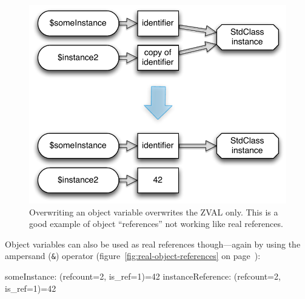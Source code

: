 \begin{figure}[htb]
  \begin{center}
    \includegraphics[scale=0.8]{images/someInstance_instance2}
    \caption{Overwriting an object variable overwrites the ZVAL only. This is a good example of object ``references'' not working like real references.}
    \label{fig:false-object-references}
  \end{center}
\end{figure}

Object variables can also be used as real references though---again by using the ampersand (\texttt{\&}) operator (figure~\ref{fig:real-object-references} on page~\pageref{fig:real-object-references}):


\begin{textcode}
someInstance: (refcount=2, is_ref=1)=42
instanceReference: (refcount=2, is_ref=1)=42
\end{textcode}

